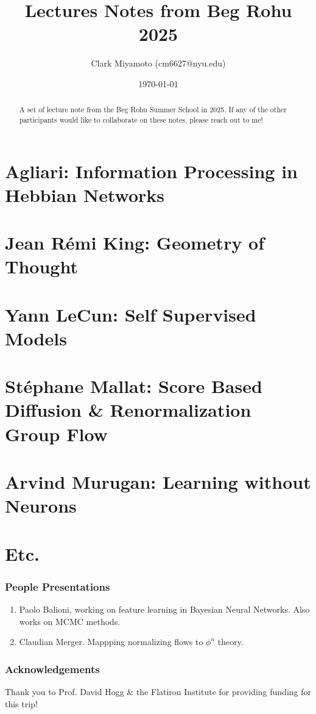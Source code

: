 \documentclass[12pt,fleqn]{article}
\title{Lectures Notes from Beg Rohu 2025}
\author{Clark Miyamoto (cm6627@nyu.edu)}
\date{\today}
\numberwithin{equation}{section} %
\begin{document}
\maketitle
\begin{abstract}
	A set of lecture note from the Beg Rohu Summer School in 2025. If any of the other participants would like to collaborate on these notes, please reach out to me!
\end{abstract}

\tableofcontents
\newpage

\part{Agliari: Information Processing in Hebbian Networks}

\newpage

\part{Jean R\'emi King: Geometry of Thought}

\newpage

\part{Yann LeCun: Self Supervised Models}

\newpage

\part{St\'ephane Mallat: Score Based Diffusion \& Renormalization Group Flow}

\newpage

\part{Arvind Murugan: Learning without Neurons}

\newpage

\part{Etc.}

\section{People Presentations} 
\begin{enumerate}
	\item Paolo Balioni, working on feature learning in Bayesian Neural Networks. Also works on MCMC methods.
	\item Claudian Merger. Mappping normalizing flows to $\phi^n$ theory.
\end{enumerate}

\section{Acknowledgements}
Thank you to Prof. David Hogg \& the Flatiron Institute for providing funding for this trip!
\end{document}
